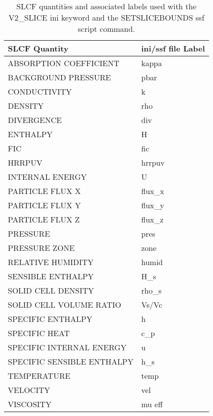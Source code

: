\begin{table}[bph]
\begin{center}
\caption{SLCF quantities and associated labels used with the V2\_SLICE ini keyword and the SETSLICEBOUNDS ssf script command.}
\vspace{0.1in}
\begin{tabular}{|l|l|}
\hline
SLCF Quantity & ini/ssf file Label \\ \hline
 ABSORPTION COEFFICIENT  &   kappa \\ \hline
 BACKGROUND PRESSURE  &   pbar \\ \hline
 CONDUCTIVITY  &   k \\ \hline
 DENSITY  &   rho \\ \hline
 DIVERGENCE  &   div \\ \hline
 ENTHALPY  &   H \\ \hline
 FIC  &   fic \\ \hline
 HRRPUV  &   hrrpuv \\ \hline
 INTERNAL ENERGY  &   U \\ \hline
 PARTICLE FLUX X  &   flux\_x \\ \hline
 PARTICLE FLUX Y  &   flux\_y \\ \hline
 PARTICLE FLUX Z  &   flux\_z \\ \hline
 PRESSURE  &   pres \\ \hline
 PRESSURE ZONE  &   zone \\ \hline
 RELATIVE HUMIDITY  &   humid \\ \hline
 SENSIBLE ENTHALPY  &   H\_s \\ \hline
 SOLID CELL DENSITY  &   rho\_s \\ \hline
 SOLID CELL VOLUME RATIO  &   Vs/Vc \\ \hline
 SPECIFIC ENTHALPY  &   h \\ \hline
 SPECIFIC HEAT  &   c\_p \\ \hline
 SPECIFIC INTERNAL ENERGY  &   u \\ \hline
 SPECIFIC SENSIBLE ENTHALPY  &   h\_s \\ \hline
 TEMPERATURE  &   temp \\ \hline
 VELOCITY  &   vel \\ \hline
 VISCOSITY  &   mu eff \\ \hline
\end{tabular}
\label{tabSLCF}
\end{center}
\end{table}
